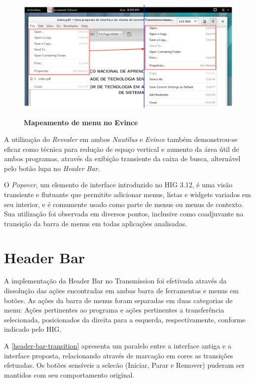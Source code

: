 \begin{figure}[!h]
  \begin{center}
    \caption{\textbf{Mapeamento de menu no Evince}}
    \includegraphics [width=\textwidth]{image/evince-menubar-mapping.eps}
    \label{rip-menubar}
  \end{center}
\end{figure}

A utilização do \textit{Revealer} em ambos \textit{Nautilus} e \textit{Evince}
também demonstrou-se eficaz como técnica para redução de espaço vertical e
aumento da área útil de ambos programas, através da exibição transiente da caixa
de busca, alternável pelo botão lupa no \textit{Header Bar}.

O \textit{Popover}, um elemento de interface introduzido no HIG 3.12, é uma
visão transiente e flutuante que permitite adicionar menus, listas e widgets
variados em seu interior, e é comumente usado como parte de menus ou menus de
contexto. Sua utilização foi observada em diversos pontos, inclusive como
coadjuvante na transição da barra de menus em todas aplicações analisadas.



\section{Header Bar}

A implementação da Header Bar no Transmission foi efetivada através da
dissolução das ações encontradas em ambas barra de ferramentas e menus em
botões. As ações da barra de menus foram separadas em duas categorias de menu:
Ações pertinentes ao programa e ações pertinentes a transferência selecionada,
posicionados da direita para a esquerda, respectivamente, conforme indicado pelo
HIG.

A \autoref{header-bar-transition} apresenta um paralelo entre a interface antiga
e a interface proposta, relacionando através de marcação em cores as transições
efetuadas. Os botões sensíveis a selecão (Iniciar, Parar e Remover) puderam ser
mantidos com seu comportamento original.


